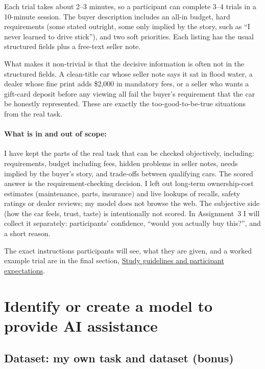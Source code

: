 \documentclass[11pt]{article}
\begin{document}
Each trial takes about 2--3 minutes, so a participant can complete 3--4 trials in a 10-minute
session. The buyer description includes an all-in budget, hard requirements (some stated
outright, some only implied by the story, such as ``I never learned to drive stick''), and two
soft priorities. Each listing has the usual structured fields plus a free-text seller note.

What makes it non-trivial is that the decisive information is often not in the structured
fields. A clean-title car whose seller note says it sat in flood water, a dealer whose fine print
adds \$2,000 in mandatory fees, or a seller who wants a gift-card deposit before any viewing all
fail the buyer's requirement that the car be honestly represented. These are exactly the
too-good-to-be-true situations from the real task.

\paragraph{What is in and out of scope:} I have kept the parts of the real task that can be checked
objectively, including: requirements, budget including fees, hidden problems in seller notes, needs implied by
the buyer's story, and trade-offs between qualifying cars. The scored answer is the
requirement-checking decision. I left out long-term ownership-cost estimates (maintenance,
parts, insurance) and live lookups of recalls, safety ratings or dealer reviews; my model does not
browse the web. The subjective side (how the car feels, trust, taste) is intentionally not scored.
In Assignment~3 I will collect it separately: participants' confidence, ``would you actually buy
this?'', and a short reason.

The exact instructions participants will see, what they are given, and a worked example trial are
in the final section, \hyperref[sec:guidelines]{Study guidelines and participant expectations}.

\section{Identify or create a model to provide AI assistance}\label{part:model}

\subsection{Dataset: my own task and dataset (bonus)}\label{sec:data}
\end{document}

